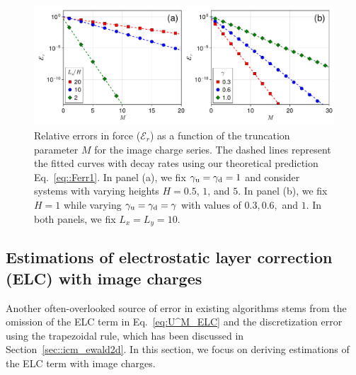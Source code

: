 \begin{figure}[htbp]
    \centering
    \includegraphics[width=0.98\linewidth]{figs/icm_error_force.pdf}
    \caption{
        Relative errors in force ($\mathcal{E}_r$) as a function of the truncation parameter $M$ for the image charge series. 
        The dashed lines represent the fitted curves with decay rates using our theoretical prediction Eq.~\eqref{eq::Ferr1}. 
        In panel (a), we fix $\gamma_{\text{u}} = \gamma_{\text{d}} = 1$ and consider systems with varying heights $H = 0.5$, $1$, and $5$. In panel (b), we fix $H = 1$ while varying $\gamma_{\text{u}} = \gamma_{\text{d}} = \gamma$ with values of $0.3, 0.6,$ and $1$. In both panels, we fix $L_x=L_y=10$.
    }
    \label{fig:icm_error_force}
\end{figure}

\subsection{Estimations of electrostatic layer correction (ELC) with image charges}\label{sec:error_reform}

Another often-overlooked source of error in existing algorithms stems from the omission of the ELC term in Eq.~\eqref{eq:U^M_ELC} and the discretization error using the trapezoidal rule, which has been discussed in Section~\ref{sec::icm_ewald2d}. 
In this section, we focus on deriving estimations of the ELC term with image charges.

